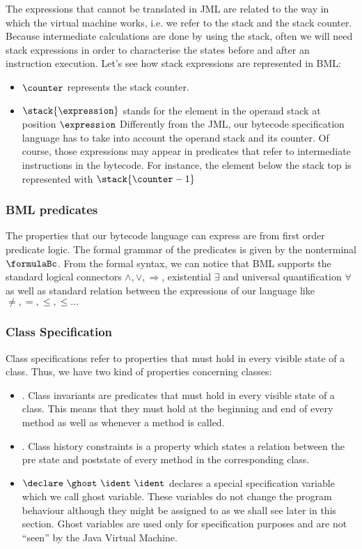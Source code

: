 The expressions that cannot be translated in JML are related to the way in which the virtual machine works, i.e. we refer to the stack and the stack counter.
Because intermediate calculations are done by using the stack, often we will need stack expressions in order to characterise the states before and after an instruction
execution. Let's see how stack expressions are represented in BML:
\begin{itemize}
      \item  $\counter$ represents the stack counter.
  \item  $\stack{ \expression}$ stands for the element in the operand stack at position $\expression$
             Differently from the JML, our bytecode specification language has to take into 
             account the operand stack and its counter. Of course, those expressions may appear in predicates that refer to intermediate instructions
	     in the bytecode. 
	     For instance, the element below the stack top is represented with $\stack{\counter - 1}$ 
 \end{itemize}

\subsubsection{BML predicates}
 The properties that our bytecode language can express are from first order predicate logic. The formal grammar of the predicates is
 given by the nonterminal $\formulaBc$. From the formal syntax, we can notice that BML supports the standard logical connectors
 $\wedge, \vee, \Rightarrow $, existential $\exists$ and universal quantification $\forall$ as well as standard relation between
 the  expressions of our language like $\neq, = , \leq, \le \ldots$  
 

\subsubsection{Class Specification} 
Class specifications refer to properties that must hold in every visible state of a class. Thus, we have
two kind of properties concerning classes: 
\begin{itemize}
      \item \ClassInv. Class invariants are predicates that must hold in every visible state of a class.
                       This means that they must hold at the beginning and end of every method as well as whenever a method is called.
      \item \ClassHistoryConstr. Class history constraints is a property which states a relation between the pre state and poststate of every 
                                method in the corresponding class. 
      \item  $\declare \ \ghost \ \ident  \ \ident$ declares a special specification variable which we call ghost variable.
             These variables do not change the program behaviour although they might be assigned to as we shall see later in this section.
	     Ghost variables are used only for specification purposes and  are not ``seen'' by the Java Virtual Machine.   
\end{itemize}
 
